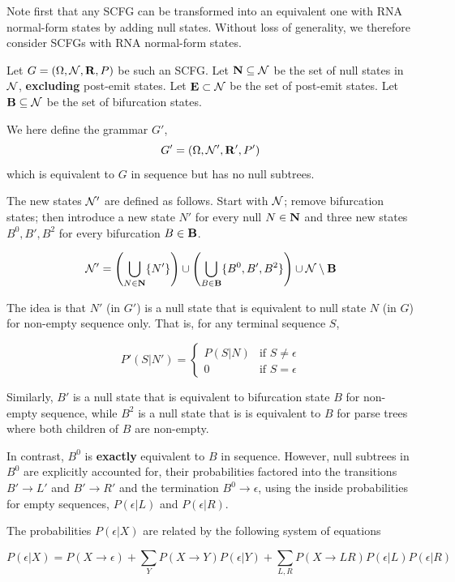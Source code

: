 \documentclass[10pt]{article}
\begin{document}
Note first that any SCFG can be transformed into an equivalent one with RNA normal-form states by adding null states.
Without loss of generality, we therefore consider SCFGs with RNA normal-form states.

Let $G = ( \Omega, {\cal N}, {\bf R}, P )$ be such an SCFG.
Let ${\bf N} \subseteq {\cal N}$ be the set of null states in ${\cal N}$, {\bf excluding} post-emit states.
Let ${\bf E} \subset {\cal N}$ be the set of post-emit states.
Let ${\bf B} \subseteq {\cal N}$ be the set of bifurcation states.

We here define the grammar $G'$,
\[
G' = \left( \Omega, {\cal N}', {\bf R}', P' \right)
\]
which is equivalent to $G$ in sequence but has no null subtrees.

The new states ${\cal N}'$ are defined as follows.
Start with ${\cal N}$; remove bifurcation states;
then introduce a new state $N'$ for every null $N \in {\bf N}$ and three new states $B^0, B', B^2$ for every bifurcation $B \in {\bf B}$.

\[
{\cal N}' = 
\left( \bigcup_{N \in {\bf N}} \{ N' \} \right) \cup \left( \bigcup_{B \in {\bf B}} \{ B^0, B', B^2 \} \right) \cup {\cal N} \setminus {\bf B}
\]

The idea is that $N'$ (in $G'$) is a null state that is equivalent to null state $N$ (in $G$) for non-empty sequence only.
That is, for any terminal sequence $S$,

\[
P'(S|N') = \left\{ \begin{array}{ll} P(S|N) & \mbox{if $S \neq \epsilon$} \\ 0 & \mbox{if $S = \epsilon$} \end{array} \right.
\]

Similarly, $B'$ is a null state that is equivalent to bifurcation state $B$ for non-empty sequence,
while $B^2$ is a null state that is is equivalent to $B$ for parse trees where both children of $B$ are non-empty.

In contrast, $B^0$ is {\bf exactly} equivalent to $B$ in sequence.
However, null subtrees in $B^0$ are explicitly accounted for,
their probabilities factored into the transitions $B' \to L'$ and $B' \to R'$ and the termination $B^0 \to \epsilon$,
using the inside probabilities for empty sequences, $P(\epsilon|L)$ and $P(\epsilon|R)$.

The probabilities $P(\epsilon|X)$ are related by the following system of equations

\[
P(\epsilon|X) = P(X \to \epsilon) + \sum_Y P(X \to Y) P(\epsilon|Y) + \sum_{L,R} P(X \to LR) P(\epsilon|L) P(\epsilon|R)
\]
\end{document}
